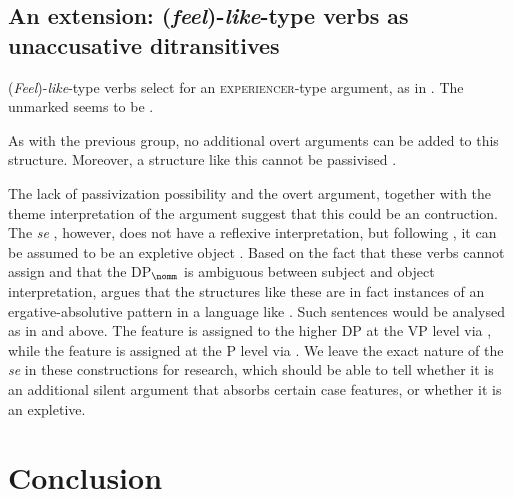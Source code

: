 \documentclass[output=paper,modfonts,newtxmath,hidelinks]{langscibook}
\begin{document}
\subsection{An extension: (\textit{feel})-\textit{like}-type verbs as unaccusative ditransitives}

(\textit{Feel})-\textit{like}-type verbs select for an \textsc{experiencer}-type  argument, as in . The unmarked  seems to be \datt{} \before{} \nomm.

\label{16:ex38}
\z

\noindent As with the previous group, no additional overt  arguments can be added to this structure. Moreover, a structure like this cannot be passivised . 

\label{16:ex39}
\z

\noindent The lack of passivization possibility and the overt  argument, together with the theme interpretation of the \nomm{} argument suggest that this could be an  contruction. The \textit{se} , however, does not have a reflexive interpretation, but following \citet{progovac13}, it can be assumed to be an expletive object . Based on the fact that these verbs cannot assign  and that the DP$_{\nomm}$ is ambiguous between subject and object interpretation, \citet{progovac13} argues that the structures like these are in fact instances of an ergative-absolutive pattern in a language like . Such sentences would be analysed as in  and  above. The \lr{} feature is assigned to the higher DP at the VP level via \down, while the \hr{} feature is assigned at the \littlev{}P level via \up. We leave the exact nature of the  \textit{se} in these constructions for  research, which should be able to tell whether it is an additional silent argument that absorbs certain case features, or whether it is an expletive.	

\section{Conclusion}
\end{document}
